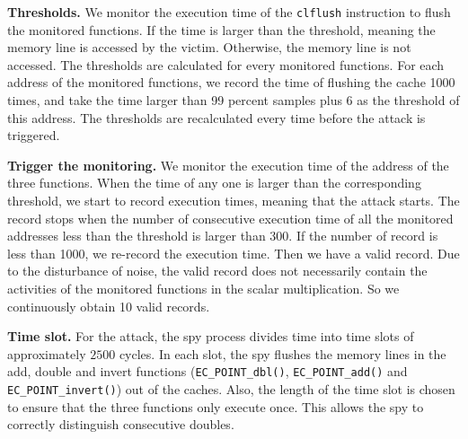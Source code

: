 
%
%
%



\noindent\textbf{Thresholds.}
We monitor the execution time of the \verb+clflush+ instruction to flush the monitored functions.
If the time is larger than the threshold, meaning the memory line is accessed by the victim.
Otherwise, the memory line is not accessed.
The thresholds are calculated for every monitored functions.
For each address of the monitored functions, we record the time of flushing the cache 1000 times, and take the time larger than 99 percent samples plus 6 as the threshold of this address.
The thresholds are recalculated every time before the attack is triggered.




\noindent\textbf{Trigger the monitoring.}
We monitor the execution time of the address of the three functions.
When the time of any one is larger than the corresponding threshold,
 we start to record execution times, meaning that the attack starts.
The record stops when the number of consecutive execution time of all the monitored addresses less than the threshold  is larger than 300.
If the number of record is less than 1000, we re-record the execution time.
Then we have a valid record.
 Due to the  disturbance of noise,
  the valid record does not necessarily contain the activities of the monitored functions in the scalar multiplication.
So we continuously obtain 10 valid records.


\noindent\textbf{Time slot.}
For the attack, the spy process divides time into time slots of approximately $2500$ cycles.
In each slot, the spy flushes the memory lines in the add, double and invert functions (\verb+EC_POINT_dbl()+,  \verb+EC_POINT_add()+ and \verb+EC_POINT_invert()+) out of the caches.
Also, the length of the time slot is chosen to ensure that the three functions only execute once.
This allows the spy to correctly distinguish consecutive doubles.

